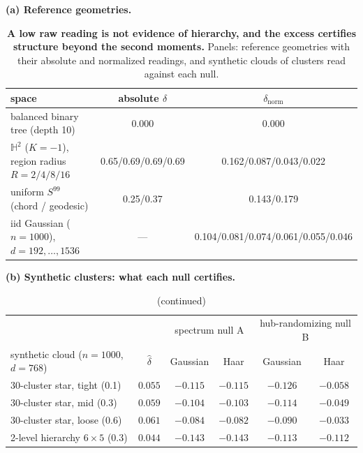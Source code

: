\begin{table}[H]
\centering
\small
\setlength{\tabcolsep}{4pt}
\noindent\textbf{(a) Reference geometries.}\par\vspace{1.5pt}
\begin{tabular}{lcc}
\toprule
space & absolute $\delta$ & $\delta_{\text{norm}}$ \\
\midrule
balanced binary tree (depth 10) & 0.000 & 0.000 \\
$\mathbb{H}^2$ ($K{=}-1$), region radius $R{=}2/4/8/16$ & 0.65/0.69/0.69/0.69 & 0.162/0.087/0.043/0.022 \\
uniform $S^{99}$ (chord / geodesic) & 0.25/0.37 & 0.143/0.179 \\
iid Gaussian ($n{=}1000$), $d{=}192,\dots,1536$ & --- & 0.104/0.081/0.074/0.061/0.055/0.046 \\
\bottomrule
\end{tabular}
\par\vspace{2pt}
\caption{\textbf{A low raw reading is not evidence of hierarchy, and the excess certifies structure beyond the second moments.} Panels: reference geometries with their absolute and normalized readings, and synthetic clouds of clusters read against each null.
}
\label{tab:q10-calibration}
\end{table}
\begin{table}[H]\ContinuedFloat
\centering
\small
\setlength{\tabcolsep}{4pt}
\noindent\textbf{(b) Synthetic clusters: what each null certifies.}\par\vspace{1.5pt}
\begin{tabular}{lc|cc|cc}
\toprule
& & \multicolumn{2}{c|}{spectrum null A} & \multicolumn{2}{c}{hub-randomizing null B} \\
synthetic cloud ($n{=}1000$, $d{=}768$) & $\hat\delta$ & Gaussian & Haar & Gaussian & Haar \\
\midrule
30-cluster star, tight (0.1) & $0.055$ & $-0.115$ & $-0.115$ & $-0.126$ & $-0.058$ \\
30-cluster star, mid (0.3) & $0.059$ & $-0.104$ & $-0.103$ & $-0.114$ & $-0.049$ \\
30-cluster star, loose (0.6) & $0.061$ & $-0.084$ & $-0.082$ & $-0.090$ & $-0.033$ \\
2-level hierarchy $6\times5$ (0.3) & $0.044$ & $-0.143$ & $-0.143$ & $-0.113$ & $-0.112$ \\
\bottomrule
\end{tabular}
\par\vspace{2pt}
\caption{(continued)}
\end{table}
